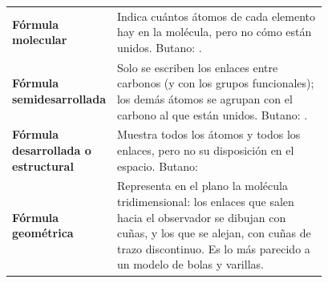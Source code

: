 \begin{center}
    {\small
    \begin{tabular}{@{}l L{0.78\linewidth}@{}}
        \toprule
        \textbf{Fórmula molecular} & Indica cuántos átomos de cada elemento hay en la molécula, pero no cómo están unidos. Butano: . \\[3pt]
        \textbf{Fórmula semidesarrollada} & Solo se escriben los enlaces entre carbonos (y con los grupos funcionales); los demás átomos se agrupan con el carbono al que están unidos. Butano: . \\[3pt]
        \textbf{Fórmula desarrollada o estructural} & Muestra todos los átomos y todos los enlaces, pero no su disposición en el espacio. Butano:  \\[3pt]
        \textbf{Fórmula geométrica} & Representa en el plano la molécula tridimensional: los enlaces que salen hacia el observador se dibujan con cuñas, y los que se alejan, con cuñas de trazo discontinuo. Es lo más parecido a un modelo de bolas y varillas. \\
        \bottomrule
    \end{tabular}
    }
\end{center}

